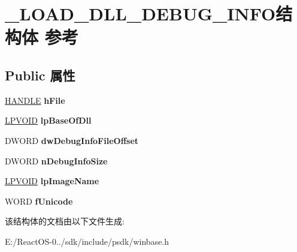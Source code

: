 \hypertarget{struct___l_o_a_d___d_l_l___d_e_b_u_g___i_n_f_o}{}\section{\+\_\+\+L\+O\+A\+D\+\_\+\+D\+L\+L\+\_\+\+D\+E\+B\+U\+G\+\_\+\+I\+N\+F\+O结构体 参考}
\label{struct___l_o_a_d___d_l_l___d_e_b_u_g___i_n_f_o}
\subsection*{Public 属性}
\begin{DoxyCompactItemize}
\item 
\mbox{\label{struct___l_o_a_d___d_l_l___d_e_b_u_g___i_n_f_o_aada8f0ec6435bc48c7ef9150cb501d41}} 
\hyperlink{interfacevoid}{H\+A\+N\+D\+LE} {\bfseries h\+File}
\item 
\mbox{\label{struct___l_o_a_d___d_l_l___d_e_b_u_g___i_n_f_o_a9c3777f47e027b51cee8e80272d6c931}} 
\hyperlink{interfacevoid}{L\+P\+V\+O\+ID} {\bfseries lp\+Base\+Of\+Dll}
\item 
\mbox{\label{struct___l_o_a_d___d_l_l___d_e_b_u_g___i_n_f_o_a48c74930cb9b9a8b0f836530bac5b0e9}} 
D\+W\+O\+RD {\bfseries dw\+Debug\+Info\+File\+Offset}
\item 
\mbox{\label{struct___l_o_a_d___d_l_l___d_e_b_u_g___i_n_f_o_ad0f264dfc7bf23222cc6231bc01894e7}} 
D\+W\+O\+RD {\bfseries n\+Debug\+Info\+Size}
\item 
\mbox{\label{struct___l_o_a_d___d_l_l___d_e_b_u_g___i_n_f_o_a3657ee9facbb8dca95927461a9a88ee0}} 
\hyperlink{interfacevoid}{L\+P\+V\+O\+ID} {\bfseries lp\+Image\+Name}
\item 
\mbox{\label{struct___l_o_a_d___d_l_l___d_e_b_u_g___i_n_f_o_a9799d597205047b56397cad8fa9be590}} 
W\+O\+RD {\bfseries f\+Unicode}
\end{DoxyCompactItemize}


该结构体的文档由以下文件生成\+:\begin{DoxyCompactItemize}
\item 
E\+:/\+React\+O\+S-\/0../sdk/include/psdk/winbase.\+h\end{DoxyCompactItemize}
